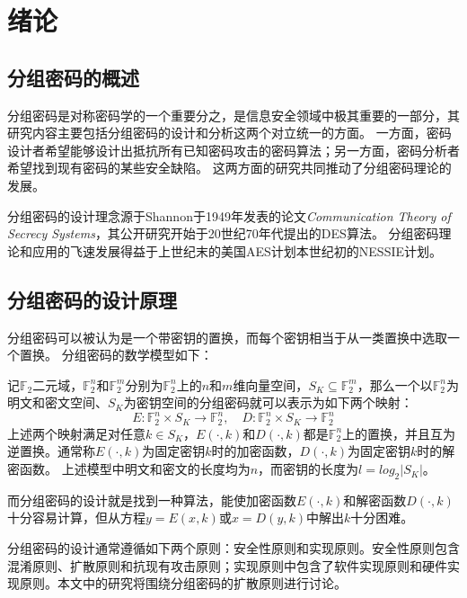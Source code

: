 
\chapter{绪论}
\label{chap:Pre}
\section{分组密码的概述}
分组密码是对称密码学的一个重要分之，是信息安全领域中极其重要的一部分，其研究内容主要包括分组密码的设计和分析这两个对立统一的方面。
一方面，密码设计者希望能够设计出抵抗所有已知密码攻击的密码算法；另一方面，密码分析者希望找到现有密码的某些安全缺陷。
这两方面的研究共同推动了分组密码理论的发展。

分组密码的设计理念源于Shannon于1949年发表的论文\emph{Communication Theory of Secrecy Systems}\cite{shannon1949communication}，其公开研究开始于20世纪70年代提出的DES算法。
分组密码理论和应用的飞速发展得益于上世纪末的美国AES计划本世纪初的NESSIE计划。

\section{分组密码的设计原理}
分组密码可以被认为是一个带密钥的置换，而每个密钥相当于从一类置换中选取一个置换。
分组密码的数学模型如下：
\begin{defn}[分组密码]
    记$\mathbb{F}_2$二元域，$\mathbb{F}_2^n$和$\mathbb{F}_2^m$分别为$\mathbb{F}_2^n$上的$n$和$m$维向量空间，$S_K\subseteq\mathbb{F}_2^m$，那么一个以$\mathbb{F}_2^n$为明文和密文空间、$S_K$为密钥空间的分组密码就可以表示为如下两个映射：
    $$E:\mathbb{F}_2^n\times S_K\rightarrow\mathbb{F}_2^n,\quad D:\mathbb{F}_2^n\times S_K\rightarrow\mathbb{F}_2^n$$
    上述两个映射满足对任意$k\in S_K$，$E(\cdot,k)$和$D(\cdot,k)$都是$\mathbb{F}_2^n$上的置换，并且互为逆置换。通常称$E(\cdot,k)$为固定密钥$k$时的加密函数，$D(\cdot,k)$为固定密钥$k$时的解密函数。
    上述模型中明文和密文的长度均为$n$，而密钥的长度为$l=log_2|S_K|$。
\end{defn}
而分组密码的设计就是找到一种算法，能使加密函数$E(\cdot,k)$和解密函数$D(\cdot,k)$十分容易计算，但从方程$y=E(x,k)$或$x=D(y,k)$中解出$k$十分困难。

分组密码的设计通常遵循如下两个原则：安全性原则和实现原则。安全性原则包含混淆原则、扩散原则和抗现有攻击原则；实现原则中包含了软件实现原则和硬件实现原则。本文中的研究将围绕分组密码的扩散原则进行讨论。

